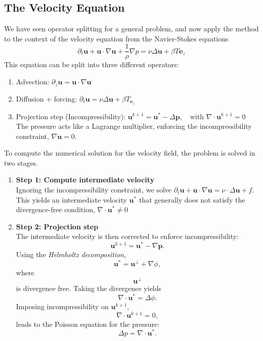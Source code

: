 \subsection{The Velocity Equation}
We have seen operator splitting for a general problem, and now apply the
method to the context of the velocity equation from the Navier-Stokes
equations
$$ \partial_t \bm{u} + \bm{u} \cdot \nabla \bm u + \frac{1}{\rho}\nabla p
= \nu \Delta \bm{u} + \beta T\bm{e}_z $$
This equation can be split into three different operators:
\begin{enumerate}
    \item{Advection: $\partial_z \bm{u} = \bm{u}\cdot \nabla \bm{u}$}
    \item {Diffusion + forcing: $\partial_t \bm {u} = \nu \Delta \bm{u}
            + \beta T_{\bm{e}_z}$}
    \item {Projection step (Incompressibility): $\bm{u}^{k+1}= \bm{u}^*-
            \Delta \bm{p}, \quad \text{with } \nabla \cdot \bm{u}^{k+1}=0$
             \\ The pressure acts like a Lagrange multiplier, enforcing
             the incompressibility constraint, $\nabla \bm{u}=0.$}
    
\end{enumerate}

To compute the numerical solution for the velocity field, the problem is
solved in two stages.
\begin{enumerate}
    \item{\textbf{Step 1: Compute intermediate velocity} \\ Ignoring the
        incompressibility constraint, we solve $\partial_t \bm{u}+\bm{u}
        \cdot \nabla \bm{u} = \nu \cdot \Delta \bm{u} + f$. This yields an
        intermediate velocity $\bm u^*$ that generally does not satisfy
        the divergence-free condition, $\nabla \cdot \bm u^* \neq 0$}
    
    \item{\textbf{Step 2: Projection step} \\ The intermediate velocity is
    then corrected to enforce incompressibility: $$ \bm{u}^{k+1} = 
    \bm{u}^*-\nabla \bm{p}.$$ Using the \textit{Helmholtz decomposition},
    $$\bm{u}^* = \bm{u}^\perp + \nabla \phi,$$ where $$\bm{u}^{\perp}$$ is
    divergence free. Taking the divergence yields $$\nabla \cdot \bm{u}^* 
    = \Delta \phi.$$ Imposing incompressibility on $\bm{u}^{k+1}$, 
    $$\nabla \cdot \bm{u}^{k+1} = 0,$$ leads to the Poisson equation for
    the pressure: $$\Delta p = \nabla \cdot \bm{u}^*.$$}
\end{enumerate}


